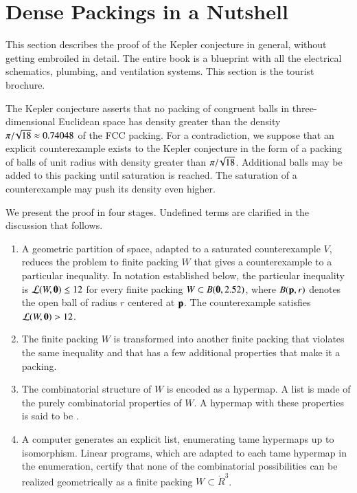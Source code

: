 \section{Dense Packings in a Nutshell}

This section describes the proof of the Kepler conjecture in general,
without
getting embroiled in detail.  The entire book
is a blueprint with all the electrical schematics, plumbing, and
ventilation systems.  This section is the tourist brochure.

The Kepler conjecture asserts that no packing of congruent balls in
three-dimensional Euclidean space has density greater than the density
$\pi/\!\sqrt{18} \approx 0.74048$ of the FCC packing.  For a contradiction, we suppose that an
explicit counterexample exists to the Kepler conjecture in the form of a
packing of balls of unit radius with density  greater than
$\pi/\!\sqrt{18}$.  Additional balls may be added to this packing until
saturation is reached.  The saturation of a counterexample may push its
density even higher.

We present the proof in four stages.  Undefined terms are clarified in the
discussion that follows.

\begin{enumerate}
\item A geometric partition of space, adapted to a saturated
  counterexample $V$, reduces the problem to finite packing $W$ that
  gives a counterexample to a particular inequality.  In notation
  established below, the particular inequality is ${\mathcal L}(W,{\mathbf 0})\le
  12$ for every finite packing $W\subset B({\mathbf 0},2.52)$, where $B({\mathbf p},r)$
denotes the open ball of radius $r$ centered at ${\mathbf p}$.  The
  counterexample satisfies ${\mathcal L}(W,{\mathbf 0})>12$.
\item The finite packing $W$ is transformed into another finite packing that violates the same
inequality and that has a few additional properties that make it a  packing.
\item The combinatorial structure of $W$ is encoded as a hypermap.  A list is
  made of the purely combinatorial properties of $W$.  A hypermap with
  these properties is said to be .
\item A computer generates an explicit list, enumerating
  tame hypermaps up to isomorphism.  Linear programs, which are
  adapted to each tame hypermap in the enumeration, certify that
  none of the combinatorial possibilities can be  realized geometrically as a finite packing
  $W\subset \ring{R}^3$.  
\end{enumerate}
%
%


